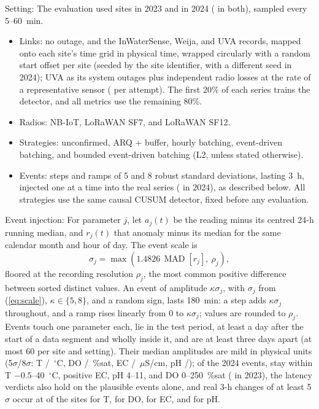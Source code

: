 Setting: The evaluation used \designSites{} sites in 2023 and \confSites{} in 2024 (\sitesBothYears{} in both), sampled every 5--60~min.
\begin{itemize}
\item Links: no outage, and the InWaterSense, Weija, and UVA records, mapped onto each site's time grid in physical time, wrapped circularly with a random start offset per site (seeded by the site identifier, with a different seed in 2024); UVA as its system outages plus independent radio losses at the rate of a representative sensor (\uvaSensorFourRadio{} per attempt). The first 20\% of each series trains the detector, and all metrics use the remaining 80\%.
\item Radios: NB-IoT, LoRaWAN SF7, and LoRaWAN SF12.
\item Strategies: unconfirmed, ARQ + buffer, hourly batching, event-driven batching, and bounded event-driven batching (L2, unless stated otherwise).
\item Events: steps and ramps of 5 and 8 robust standard deviations, lasting 3~h, injected one at a time into the real series (\designEventsConf{} in 2024), as described below. All strategies use the same causal CUSUM detector, fixed before any evaluation.
\end{itemize}

Event injection: For parameter $j$, let $a_j(t)$ be the reading minus its centred 24-h running median, and $r_j(t)$ that anomaly minus its median for the same calendar month and hour of day. The event scale is
\begin{equation}
\sigma_j=\max\left(1.4826\,\operatorname{MAD}\!\left[r_j\right],\ \rho_j\right),
\label{eq:scale}
\end{equation}
floored at the recording resolution $\rho_j$, the most common positive difference between sorted distinct values. An event of amplitude $\kappa\sigma_j$, with $\sigma_j$ from (\ref{eq:scale}), $\kappa\in\{5,8\}$, and a random sign, lasts 180~min: a step adds $\kappa\sigma_j$ throughout, and a ramp rises linearly from 0 to $\kappa\sigma_j$; values are rounded to $\rho_j$. Events touch one parameter each, lie in the test period, at least a day after the start of a data segment and wholly inside it, and are at least three days apart (at most 60 per site and setting). Their median amplitudes are mild in physical units (5$\sigma$/8$\sigma$: T \ampFiveT/\ampEightT~$^\circ$C, DO \ampFiveDO/\ampEightDO~\%sat, EC \ampFiveEC/\ampEightEC~$\mu$S/cm, pH \ampFivePh/\ampEightPh); of the 2024 events, \plausibleConf{} stay within T $-0.5$--40~$^\circ$C, positive EC, pH 4--11, and DO 0--250~\%sat (\plausibleDev{} in 2023), the latency verdicts also hold on the plausible events alone, and real 3-h changes of at least 5$\sigma$ occur at \realFiveT{} of the sites for T, \realFiveDO{} for DO, \realFiveEC{} for EC, and \realFivePh{} for pH.

